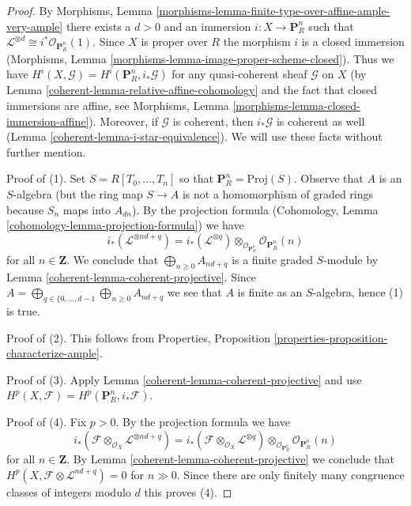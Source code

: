 \begin{proof}

By
Morphisms, Lemma \ref{morphisms-lemma-finite-type-over-affine-ample-very-ample}
there exists a $d > 0$ and an immersion $i : X \to \mathbf{P}^n_R$
such that $\mathcal{L}^{\otimes d} \cong i^*\mathcal{O}_{\mathbf{P}^n_R}(1)$.
Since $X$ is proper over $R$ the morphism $i$ is a closed immersion
(Morphisms, Lemma \ref{morphisms-lemma-image-proper-scheme-closed}).
Thus we have $H^i(X, \mathcal{G}) = H^i(\mathbf{P}^n_R, i_*\mathcal{G})$
for any quasi-coherent sheaf $\mathcal{G}$ on $X$
(by Lemma \ref{coherent-lemma-relative-affine-cohomology} and the fact that
closed immersions are affine, see
Morphisms, Lemma \ref{morphisms-lemma-closed-immersion-affine}).
Moreover, if $\mathcal{G}$ is coherent, then $i_*\mathcal{G}$
is coherent as well (Lemma \ref{coherent-lemma-i-star-equivalence}).
We will use these facts without further mention.

\medskip\noindent
Proof of (1). Set $S = R[T_0, \ldots, T_n]$ so that
$\mathbf{P}^n_R = \text{Proj}(S)$.
Observe that $A$ is an $S$-algebra (but the ring map $S \to A$ is not
a homomorphism of graded rings because $S_n$ maps into $A_{dn}$).
By the projection formula
(Cohomology, Lemma \ref{cohomology-lemma-projection-formula})
we have
$$
i_*(\mathcal{L}^{\otimes nd + q}) =
i_*(\mathcal{L}^{\otimes q})
\otimes_{\mathcal{O}_{\mathbf{P}^n_R}}
\mathcal{O}_{\mathbf{P}^n_R}(n)
$$
for all $n \in \mathbf{Z}$. We conclude that $\bigoplus_{n \geq 0} A_{nd + q}$
is a finite graded $S$-module by Lemma \ref{coherent-lemma-coherent-projective}.
Since
$A = \bigoplus_{q \in \{0, \ldots, d - 1} \bigoplus_{n \geq 0} A_{nd + q}$
we see that $A$ is finite as an $S$-algebra, hence (1) is true.

\medskip\noindent
Proof of (2). This follows from
Properties, Proposition \ref{properties-proposition-characterize-ample}.

\medskip\noindent
Proof of (3). Apply Lemma \ref{coherent-lemma-coherent-projective}
and use $H^p(X, \mathcal{F}) = H^p(\mathbf{P}^n_R, i_*\mathcal{F})$.

\medskip\noindent
Proof of (4). Fix $p > 0$. By the projection formula we have
$$
i_*(\mathcal{F} \otimes_{\mathcal{O}_X} \mathcal{L}^{\otimes nd + q}) =
i_*(\mathcal{F} \otimes_{\mathcal{O}_X} \mathcal{L}^{\otimes q})
\otimes_{\mathcal{O}_{\mathbf{P}^n_R}}
\mathcal{O}_{\mathbf{P}^n_R}(n)
$$
for all $n \in \mathbf{Z}$. By Lemma \ref{coherent-lemma-coherent-projective}
we conclude that $H^p(X, \mathcal{F} \otimes \mathcal{L}^{nd + q}) = 0$
for $n \gg 0$. Since there are only finitely many congruence classes
of integers modulo $d$ this proves (4).


\end{proof}
